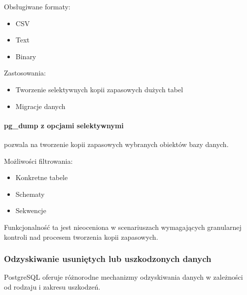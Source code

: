 \documentclass[letterpaper,10pt,polish]{sphinxmanual}
\begin{document}
\sphinxAtStartPar
Obsługiwane formaty:
\begin{itemize}
\item {} 
\sphinxAtStartPar
CSV

\item {} 
\sphinxAtStartPar
Text

\item {} 
\sphinxAtStartPar
Binary

\end{itemize}

\sphinxAtStartPar
Zastosowania:
\begin{itemize}
\item {} 
\sphinxAtStartPar
Tworzenie selektywnych kopii zapasowych dużych tabel

\item {} 
\sphinxAtStartPar
Migracje danych

\end{itemize}


\paragraph{pg\_dump z opcjami selektywnymi}
\label{\detokenize{rozdzial2/Kopie_zapasowe_i_odzyskiwanie_danych/kopie_zapasowe_i_odzyskiwanie_danych:pg-dump-z-opcjami-selektywnymi}}
\sphinxAtStartPar
{} pozwala na tworzenie kopii zapasowych wybranych obiektów bazy danych.

\sphinxAtStartPar
Możliwości filtrowania:
\begin{itemize}
\item {} 
\sphinxAtStartPar
Konkretne tabele

\item {} 
\sphinxAtStartPar
Schematy

\item {} 
\sphinxAtStartPar
Sekwencje

\end{itemize}

\sphinxAtStartPar
Funkcjonalność ta jest nieoceniona w scenariuszach wymagających granularnej kontroli nad procesem tworzenia kopii zapasowych.


\subsubsection{Odzyskiwanie usuniętych lub uszkodzonych danych}
\label{\detokenize{rozdzial2/Kopie_zapasowe_i_odzyskiwanie_danych/kopie_zapasowe_i_odzyskiwanie_danych:odzyskiwanie-usunietych-lub-uszkodzonych-danych}}
\sphinxAtStartPar
PostgreSQL oferuje różnorodne mechanizmy odzyskiwania danych w zależności od rodzaju i zakresu uszkodzeń.
\end{document}
